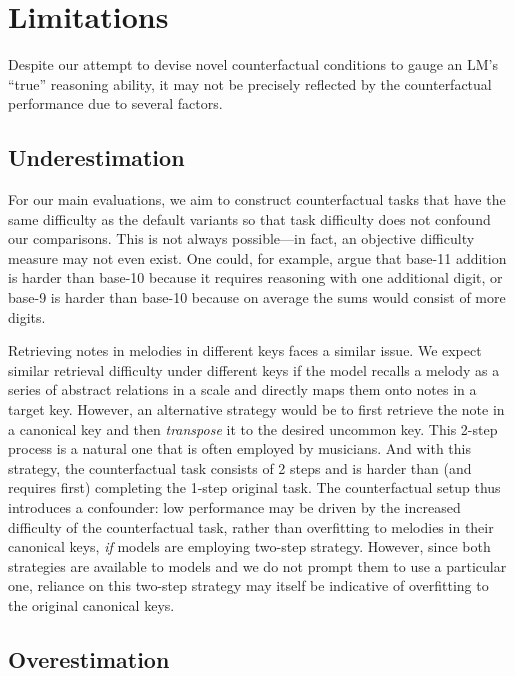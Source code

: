 \section{Limitations} \label{sec:limitations}

Despite our attempt to devise novel counterfactual conditions to gauge an LM's ``true'' reasoning ability, it may not be precisely reflected by the counterfactual performance due to several factors.

\subsection{Underestimation} \label{sec:underestimation}

For our main evaluations, we aim to construct counterfactual tasks that have the same difficulty as the default variants so that task difficulty does not confound our comparisons. This is not always possible---in fact, an objective difficulty measure may not even exist. One could, for example, argue that base-11 addition is harder than base-10 because it requires reasoning with one additional digit, or base-9 is harder than base-10 because on average the sums would consist of more digits. 



Retrieving notes in melodies in different keys faces a similar issue.
We expect similar retrieval difficulty under different keys
if the model recalls a melody as a series of abstract relations in a scale and directly maps them onto notes in a target key.
However, an alternative strategy would be to first retrieve the note in a canonical key and then \emph{transpose} it to the desired uncommon key. This 2-step process is a natural one that is often employed by musicians. And with this strategy, the counterfactual task consists of 2 steps and is harder than (and requires first) completing the 1-step original task. The counterfactual setup thus introduces a confounder: low performance may be driven by the increased difficulty of the counterfactual task, rather than overfitting to melodies in their canonical keys, \emph{if} models are employing two-step strategy. However, since both strategies are available to models and we do not prompt them to use a particular one, reliance on this two-step strategy may itself be indicative of overfitting to the original canonical keys.

\subsection{Overestimation} \label{sec:overestimation}

